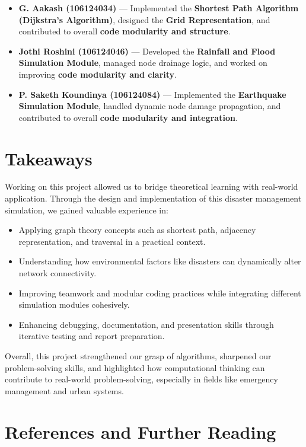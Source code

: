\documentclass[12pt,a4paper]{report}
\begin{document}
\begin{itemize}
    \item \textbf{G. Aakash (106124034)} — Implemented the \textbf{Shortest Path Algorithm (Dijkstra’s Algorithm)}, 
    designed the \textbf{Grid Representation}, and contributed to overall \textbf{code modularity and structure}.
    \item \textbf{Jothi Roshini (106124046)} — Developed the \textbf{Rainfall and Flood Simulation Module}, 
    managed node drainage logic, and worked on improving \textbf{code modularity and clarity}.
    \item \textbf{P. Saketh Koundinya (106124084)} — Implemented the \textbf{Earthquake Simulation Module}, 
    handled dynamic node damage propagation, and contributed to overall \textbf{code modularity and integration}.
\end{itemize}

\chapter{Takeaways}

Working on this project allowed us to bridge theoretical learning with real-world application.  
Through the design and implementation of this disaster management simulation, we gained valuable 
experience in:

\begin{itemize}
    \item Applying graph theory concepts such as shortest path, adjacency representation, and traversal in a practical context.
    \item Understanding how environmental factors like disasters can dynamically alter network connectivity.
    \item Improving teamwork and modular coding practices while integrating different simulation modules cohesively.
    \item Enhancing debugging, documentation, and presentation skills through iterative testing and report preparation.
\end{itemize}

Overall, this project strengthened our grasp of algorithms, sharpened our problem-solving skills, 
and highlighted how computational thinking can contribute to real-world problem-solving, especially 
in fields like emergency management and urban systems.


\chapter{References and Further Reading}
\end{document}
